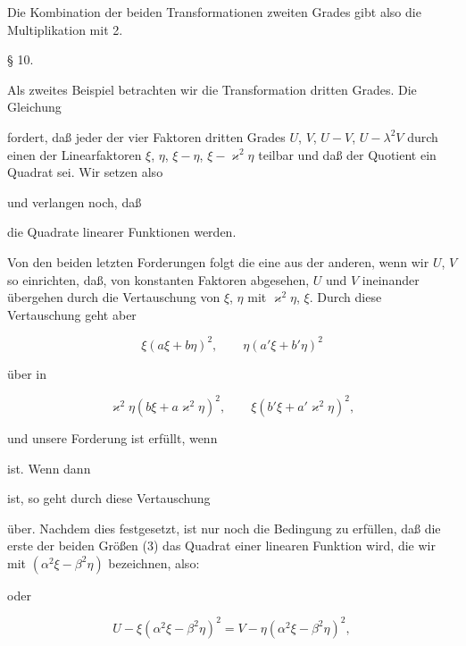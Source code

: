 Die Kombination der beiden Transformationen zweiten Grades gibt also die
Multiplikation mit 2.

\begin{center}
§ 10. 
\end{center}

Als zweites Beispiel betrachten wir die Transformation dritten Grades.
Die Gleichung


fordert, daß jeder der vier Faktoren dritten Grades $U$, $V$, $U-V$,
$U-\lambda^2V$ durch einen der Linearfaktoren $\xi$, $\eta$, $\xi-\eta$,
$\xi-\varkappa^2\eta$ teilbar und daß der Quotient ein Quadrat sei. Wir
setzen also


und verlangen noch, daß


die Quadrate linearer Funktionen werden.

Von den beiden letzten Forderungen folgt die eine aus der anderen, wenn
wir $U$, $V$ so einrichten, daß, von konstanten Faktoren abgesehen, $U$
und $V$ ineinander übergehen durch die Vertauschung von $\xi$, $\eta$ mit
$\varkappa^2\eta$, $\xi$. Durch diese Vertauschung geht aber

\[
\xi(a\xi+b\eta)^2, \qquad \eta(a'\xi+b'\eta)^2
\]

über in

\[
\varkappa^2\eta(b\xi+a\varkappa^2\eta)^2, \qquad \xi(b'\xi+a'\varkappa^2\eta)^2,
\]

und unsere Forderung ist erfüllt, wenn


ist. Wenn dann


ist, so geht durch diese Vertauschung


über. Nachdem dies festgesetzt, ist nur noch die Bedingung zu erfüllen,
daß die erste der beiden Größen (3) das Quadrat einer linearen Funktion
wird, die wir mit $(\alpha^2\xi-\beta^2\eta)$ bezeichnen, also:


oder

\[
U-\xi(\alpha^2\xi-\beta^2\eta)^2 = V-\eta(\alpha^2\xi-\beta^2\eta)^2,
\]
